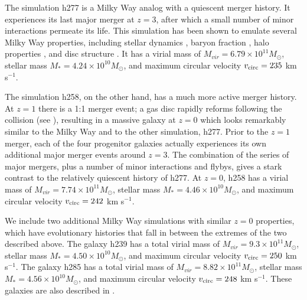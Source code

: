 \documentclass[a4paper,fleqn,usenatbib]{mnras}
\newcommand\editremark[1]{{\color{red}#1}}
\newcommand\msun{M_\odot}
\begin{document}
The simulation h277  is a Milky Way analog with a
quiescent merger history.  It experiences its last major merger at $z
= 3$, after which a small number of minor interactions permeate its
life.  This simulation has been shown to emulate several Milky Way
properties, including stellar dynamics
\citep{Loebman12,Loebman14,Kassin14}, baryon fraction
\citep{Munshi13}, halo properties \citep{Zolotov09,Zolotov10}, and
disc structure \citep{Brooks11}.  It has a virial mass of $M_{vir} =
6.79 \times 10^{11} \msun$, stellar mass $M_* = 4.24 \times 10^{10}
\msun$, and maximum circular velocity $v_{\rm circ} = 235$ km s$^{-1}$.

  The simulation h258, on the other hand, has a much
  more active merger history.  At $z = 1$ there is a 1:1 merger event;
  a gas disc rapidly reforms following the collision (see
  \citet{Governato09}), resulting in a massive galaxy at $z = 0$
  which looks remarkably similar to the Milky Way and to the other
  simulation, h277.  Prior to the $z = 1$ merger, each of the four
  progenitor galaxies actually experiences its own additional major
  merger events around $z = 3$.  The combination of
  the series of major mergers, plus a number of minor interactions and
  flybys, gives a stark contrast to the relatively quiescent history
  of h277.  At $z = 0$, h258 has a virial mass of $M_{vir} = 7.74
  \times 10^{11} \msun$, stellar mass $M_* = 4.46 \times 10^{10}
  \msun$, and maximum circular velocity $v_{\rm circ} = 242$ km s$^{-1}$.  %

We include two additional Milky Way simulations with similar $z = 0$ properties, which have evolutionary histories that fall in between the extremes of the two described above.  The galaxy h239 has a total virial mass of $M_{vir} = 9.3 \times 10^{11}\msun$, stellar mass $M_* = 4.50 \times 10^{10}
\msun$, and maximum circular velocity $v_{\rm circ} = 250$ km s$^{-1}$.  The galaxy h285 has a total virial mass of $M_{vir} = 8.82 \times 10^{11}\msun$, stellar mass $M_* = 4.56 \times 10^{10} \msun$, and maximum circular velocity $v_{\rm circ} = 248$ km s$^{-1}$.  These galaxies are also described in \citet{Munshi13,Bellovary14}.
\end{document}

